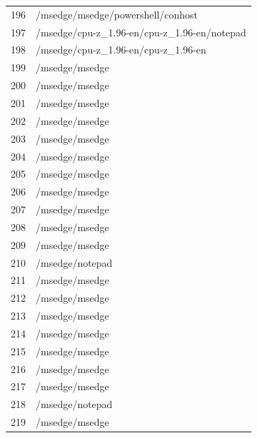 \documentclass[a4paper,twoside,12pt]{book}
\begin{document}
\begin{appendices}
\begin{table}
\end{table}
\begin{table}
	\centering
	\begin{tabular}{ll}
		\toprule
		196 &                  /msedge/msedge/powershell/conhost \\
		197 &        /msedge/cpu-z\_1.96-en/cpu-z\_1.96-en/notepad \\
		198 &                /msedge/cpu-z\_1.96-en/cpu-z\_1.96-en \\
		199 &                                     /msedge/msedge \\
		200 &                                     /msedge/msedge \\
		201 &                                     /msedge/msedge \\
		202 &                                     /msedge/msedge \\
		203 &                                     /msedge/msedge \\
		204 &                                     /msedge/msedge \\
		205 &                                     /msedge/msedge \\
		206 &                                     /msedge/msedge \\
		207 &                                     /msedge/msedge \\
		208 &                                     /msedge/msedge \\
		209 &                                     /msedge/msedge \\
		210 &                                    /msedge/notepad \\
		211 &                                     /msedge/msedge \\
		212 &                                     /msedge/msedge \\
		213 &                                     /msedge/msedge \\
		214 &                                     /msedge/msedge \\
		215 &                                     /msedge/msedge \\
		216 &                                     /msedge/msedge \\
		217 &                                     /msedge/msedge \\
		218 &                                    /msedge/notepad \\
		219 &                                     /msedge/msedge \\

\end{tabular}
\end{table}
\end{appendices}
\end{document}
